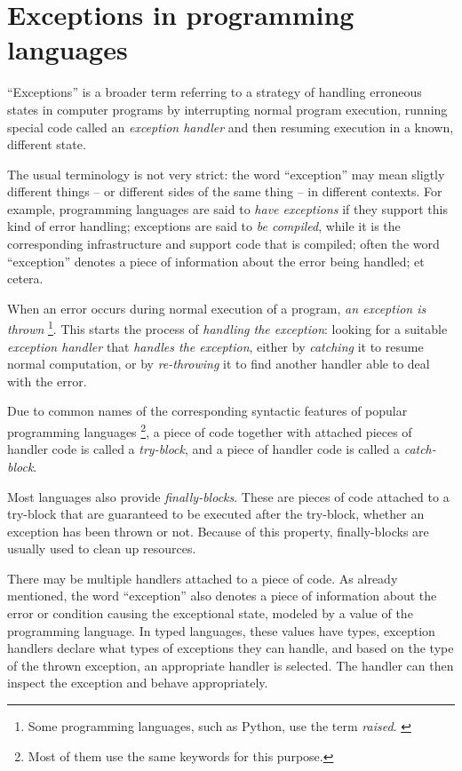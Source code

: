 \chapter{Exceptions in programming languages}

``Exceptions'' is a broader term referring to a strategy of handling erroneous
states in computer programs by interrupting normal program execution, running special
code called an \emph{exception handler} and then resuming execution in a known, different
state.

The usual terminology is not very strict: the word ``exception'' may mean sligtly
different things -- or different sides of the same thing -- in different contexts.
For example, programming languages are said to \emph{have exceptions} if they support
this kind of error handling; exceptions are said to \emph{be compiled}, while it is the
corresponding infrastructure and support code that is compiled; often the word ``exception''
denotes a piece of information about the error being handled; et cetera.

When an error occurs during normal execution of a program, \emph{an exception is thrown}%
\footnote{Some programming languages, such as Python, use the term \emph{raised}.%
\cite{python:reference}}.
This starts the
process of \emph{handling the exception}: looking for a suitable
\emph{exception handler} that \emph{handles the exception}, either by \emph{catching} it
to resume normal computation, or by \emph{re-throwing} it to find another handler
able to deal with the error.

Due to common names of the corresponding syntactic features of popular programming languages%
\footnote{Most of them use the same keywords for this purpose.},
a piece of code together with attached pieces of handler code is called a \emph{try-block},
and a piece of handler code is called a \emph{catch-block}.

Most languages also provide \emph{finally-blocks}. These are pieces of code attached to a
try-block that are guaranteed to be executed after the try-block, whether an exception
has been thrown or not. Because of this property, finally-blocks are usually used to clean up
resources.

There may be multiple handlers attached to a piece of code.
As already mentioned, the word ``exception'' also denotes a piece of information about
the error or condition causing the exceptional state, modeled by a value of the programming
language. In typed languages, these values have types, exception handlers declare what
types of exceptions they can handle, and based on the type of the thrown exception,
an appropriate handler is selected. The handler can then inspect the exception and
behave appropriately.

